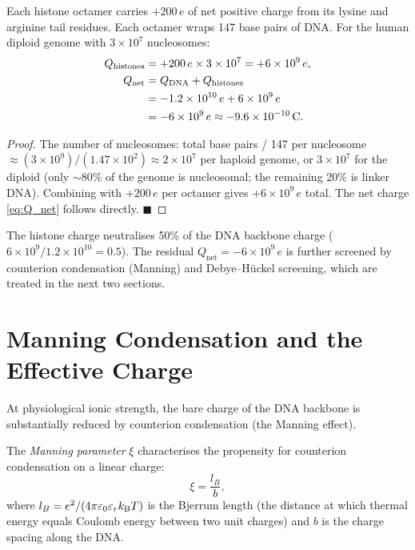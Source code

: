 \begin{proposition}
\label{prop:histone_charge}
Each histone octamer carries $+200\,e$ of net positive charge from its
lysine and arginine tail residues. Each octamer wraps 147 base pairs of
DNA. For the human diploid genome with $3 \times 10^7$ nucleosomes:
\begin{align}
  Q_{\mathrm{histones}} &= +200\,e \times 3 \times 10^7
    = +6 \times 10^9\,e, \label{eq:Q_hist}\\
  Q_{\mathrm{net}} &= Q_{\mathrm{DNA}} + Q_{\mathrm{histones}} \notag\\
    &= -1.2 \times 10^{10}\,e + 6 \times 10^9\,e \notag\\
    &= -6 \times 10^9\,e \approx -9.6 \times 10^{-10}\,\mathrm{C}.
  \label{eq:Q_net}
\end{align}
\end{proposition}

\begin{proof}
The number of nucleosomes: total base pairs / 147 per nucleosome $\approx
(3 \times 10^9) / (1.47 \times 10^2) \approx 2 \times 10^7$ per haploid
genome, or $3 \times 10^7$ for the diploid (only $\sim 80\%$ of the genome
is nucleosomal; the remaining 20\% is linker DNA). Combining with
$+200\,e$ per octamer gives $+6 \times 10^9\,e$ total. The net charge
\eqref{eq:Q_net} follows directly. $\blacksquare$
\end{proof}

\begin{remark}
The histone charge neutralises 50\% of the DNA backbone charge
($6 \times 10^9 / 1.2 \times 10^{10} = 0.5$). The residual
$Q_{\mathrm{net}} = -6 \times 10^9\,e$ is further screened by
counterion condensation (Manning) and Debye--H\"uckel screening,
which are treated in the next two sections.
\end{remark}

\section{Manning Condensation and the Effective Charge}
\label{sec:manning}

At physiological ionic strength, the bare charge of the DNA backbone is
substantially reduced by counterion condensation (the Manning effect).

\begin{definition}
\label{def:manning_param}
The \emph{Manning parameter} $\xi$ characterises the propensity for
counterion condensation on a linear charge:
\begin{equation}
  \xi = \frac{l_B}{b},
  \label{eq:manning_param}
\end{equation}
where $l_B = e^2 / (4\pi\varepsilon_0 \varepsilon_r k_{\mathrm{B}} T)$ is the
Bjerrum length (the distance at which thermal energy equals Coulomb energy
between two unit charges) and $b$ is the charge spacing along the DNA.
\end{definition}

